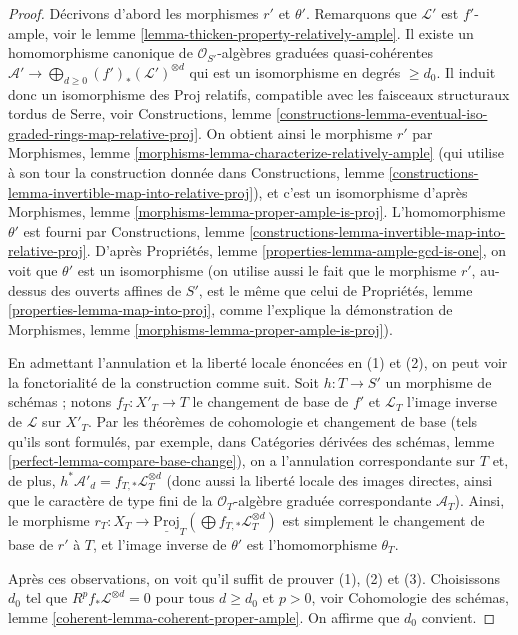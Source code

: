 \begin{proof}
Décrivons d'abord les morphismes $r'$ et $\theta'$.
Remarquons que $\mathcal{L}'$ est $f'$-ample, voir
le lemme \ref{lemma-thicken-property-relatively-ample}.
Il existe un homomorphisme canonique de
$\mathcal{O}_{S'}$-algèbres graduées quasi-cohérentes
$\mathcal{A}' \to \bigoplus_{d \geq 0} (f')_*(\mathcal{L}')^{\otimes d}$
qui est un isomorphisme en degrés $\geq d_0$.
Il induit donc un isomorphisme des Proj relatifs,
compatible avec les faisceaux structuraux tordus de Serre, voir
Constructions, lemme
\ref{constructions-lemma-eventual-iso-graded-rings-map-relative-proj}.
On obtient ainsi le morphisme $r'$ par
Morphismes, lemme \ref{morphisms-lemma-characterize-relatively-ample}
(qui utilise à son tour la construction donnée dans
Constructions, lemme
\ref{constructions-lemma-invertible-map-into-relative-proj}),
et c'est un isomorphisme d'après
Morphismes, lemme \ref{morphisms-lemma-proper-ample-is-proj}.
L'homomorphisme $\theta'$ est fourni par Constructions, lemme
\ref{constructions-lemma-invertible-map-into-relative-proj}.
D'après Propriétés, lemme \ref{properties-lemma-ample-gcd-is-one},
on voit que $\theta'$ est un isomorphisme
(on utilise aussi le fait que le morphisme $r'$, au-dessus des ouverts
affines de $S'$, est le même que celui de
Propriétés, lemme \ref{properties-lemma-map-into-proj},
comme l'explique la démonstration
de Morphismes, lemme \ref{morphisms-lemma-proper-ample-is-proj}).

\medskip\noindent
En admettant l'annulation et la liberté locale énoncées en
(1) et (2), on peut voir la fonctorialité de la construction comme suit.
Soit $h : T \to S'$ un morphisme de schémas ; notons
$f_T : X'_T \to T$ le changement de base de $f'$ et
$\mathcal{L}_T$ l'image inverse de $\mathcal{L}$ sur $X'_T$.
Par les théorèmes de cohomologie et changement de base
(tels qu'ils sont formulés, par exemple, dans Catégories dérivées des schémas,
lemme \ref{perfect-lemma-compare-base-change}),
on a l'annulation correspondante sur $T$ et, de plus,
$h^*\mathcal{A}'_d = f_{T, *}\mathcal{L}_T^{\otimes d}$
(donc aussi la liberté locale des images directes,
ainsi que le caractère de type fini de la
$\mathcal{O}_T$-algèbre graduée correspondante $\mathcal{A}_T$).
Ainsi, le morphisme
$r_T : X_T \to
\underline{\text{Proj}}_T(\bigoplus f_{T, *}\mathcal{L}_T^{\otimes d})$
est simplement le changement de base de $r'$ à $T$, et l'image inverse de
$\theta'$ est l'homomorphisme $\theta_T$.

\medskip\noindent
Après ces observations, on voit qu'il suffit de prouver
(1), (2) et (3). Choisissons $d_0$ tel que
$R^pf_*\mathcal{L}^{\otimes d} = 0$ pour tous $d \geq d_0$ et $p > 0$, voir
Cohomologie des schémas, lemme \ref{coherent-lemma-coherent-proper-ample}.
On affirme que $d_0$ convient.


\end{proof}
